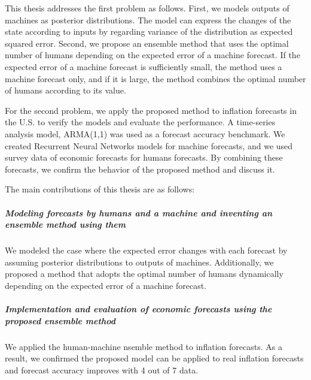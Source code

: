\documentclass[../main.tex]{subfiles}
\begin{document}
\begin{eabstract}
This thesis addresses the first problem as follows.
First, we models outputs of machines as posterior distributions.
The model can express the changes of the state according to inputs by regarding variance of the distribution as expected squared error.
Second, we propose an ensemble method that uses the optimal number of humans depending on the expected error of a machine forecast.
If the expected error of a machine forecast is sufficiently small, the method uses a machine forecast only, and if it is large, the method combines the optimal number of humans according to its value.

For the second problem, we apply the proposed method to inflation forecasts in the U.S. to verify the models and evaluate the performance.
A time-series analysis model, ARMA(1,1) was used as a forecast accuracy benchmark.
We created Recurrent Neural Networks models for machine forecasts, and we used survey data of economic forecasts for humans forecasts.
By combining these forecasts, we confirm the behavior of the proposed method and discuss it.

The main contributions of this thesis are as follows:

\subparagraph{Modeling forecasts by humans and a machine and inventing an ensemble method using them}
We modeled the case where the expected error changes with each forecast by assuming posterior distributions to outputs of machines.
Additionally, we proposed a method that adopts the optimal number of humans dynamically depending on the expected error of a machine forecast.

\subparagraph{Implementation and evaluation of economic forecasts using the proposed ensemble method}
We applied the human-machine nsemble method to inflation forecasts.
As a result, we confirmed the proposed model can be applied to real inflation forecasts and forecast accuracy improves with 4 out of 7 data.
\end{eabstract}
\end{document}
